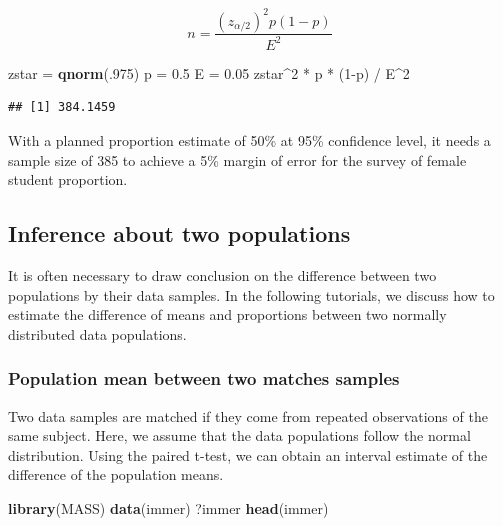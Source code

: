 \documentclass[]{article}
\newenvironment{Shaded}{\begin{snugshade}}{\end{snugshade}}
\newcommand{\KeywordTok}[1]{\textcolor[rgb]{0.13,0.29,0.53}{\textbf{{#1}}}}
\newcommand{\DecValTok}[1]{\textcolor[rgb]{0.00,0.00,0.81}{{#1}}}
\newcommand{\FloatTok}[1]{\textcolor[rgb]{0.00,0.00,0.81}{{#1}}}
\newcommand{\StringTok}[1]{\textcolor[rgb]{0.31,0.60,0.02}{{#1}}}
\newcommand{\NormalTok}[1]{{#1}}
\numberwithin{equation}{section}
\begin{document}
\[
   n  = \frac{(z_{\alpha/2})^2 p (1-p)}{E^2}
\]

\begin{Shaded}
\begin{Highlighting}[]
\NormalTok{zstar =}\StringTok{ }\KeywordTok{qnorm}\NormalTok{(.}\DecValTok{975}\NormalTok{) }
\NormalTok{p =}\StringTok{ }\FloatTok{0.5} 
\NormalTok{E =}\StringTok{ }\FloatTok{0.05} 
\NormalTok{zstar^}\DecValTok{2} \NormalTok{*}\StringTok{ }\NormalTok{p *}\StringTok{ }\NormalTok{(}\DecValTok{1}\NormalTok{-p) /}\StringTok{ }\NormalTok{E^}\DecValTok{2} 
\end{Highlighting}
\end{Shaded}

\begin{verbatim}
## [1] 384.1459
\end{verbatim}

With a planned proportion estimate of 50\% at 95\% confidence level, it
needs a sample size of 385 to achieve a 5\% margin of error for the
survey of female student proportion.

\subsection{Inference about two
populations}\label{inference-about-two-populations}

It is often necessary to draw conclusion on the difference between two
populations by their data samples. In the following tutorials, we
discuss how to estimate the difference of means and proportions between
two normally distributed data populations.

\subsubsection{Population mean between two matches
samples}\label{population-mean-between-two-matches-samples}

Two data samples are matched if they come from repeated observations of
the same subject. Here, we assume that the data populations follow the
normal distribution. Using the paired t-test, we can obtain an interval
estimate of the difference of the population means.

\begin{Shaded}
\begin{Highlighting}[]
\KeywordTok{library}\NormalTok{(MASS)}
\KeywordTok{data}\NormalTok{(immer)}
\NormalTok{?immer}
\KeywordTok{head}\NormalTok{(immer)}
\end{Highlighting}
\end{Shaded}
\end{document}
